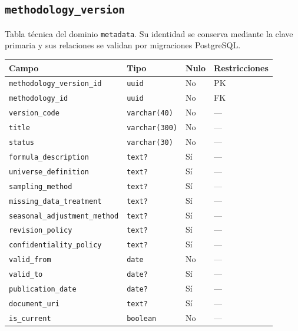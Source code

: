 \documentclass[11pt]{article}
\begin{document}
\subsection{\texttt{methodology\_version}}
Tabla técnica del dominio \texttt{metadata}. Su identidad se conserva mediante la clave primaria y sus relaciones se validan por migraciones PostgreSQL.
\begin{longtable}{>{\raggedright\arraybackslash}p{} p{} p{} p{}}
\toprule Campo & Tipo & Nulo & Restricciones \\ \midrule\endhead
\texttt{methodology\_version\_id} & \texttt{uuid} & No & PK \\
\texttt{methodology\_id} & \texttt{uuid} & No & FK \\
\texttt{version\_code} & \texttt{varchar(40)} & No & --- \\
\texttt{title} & \texttt{varchar(300)} & No & --- \\
\texttt{status} & \texttt{varchar(30)} & No & --- \\
\texttt{formula\_description} & \texttt{text?} & Sí & --- \\
\texttt{universe\_definition} & \texttt{text?} & Sí & --- \\
\texttt{sampling\_method} & \texttt{text?} & Sí & --- \\
\texttt{missing\_data\_treatment} & \texttt{text?} & Sí & --- \\
\texttt{seasonal\_adjustment\_method} & \texttt{text?} & Sí & --- \\
\texttt{revision\_policy} & \texttt{text?} & Sí & --- \\
\texttt{confidentiality\_policy} & \texttt{text?} & Sí & --- \\
\texttt{valid\_from} & \texttt{date} & No & --- \\
\texttt{valid\_to} & \texttt{date?} & Sí & --- \\
\texttt{publication\_date} & \texttt{date?} & Sí & --- \\
\texttt{document\_uri} & \texttt{text?} & Sí & --- \\
\texttt{is\_current} & \texttt{boolean} & No & --- \\
\bottomrule\end{longtable}
\end{document}
